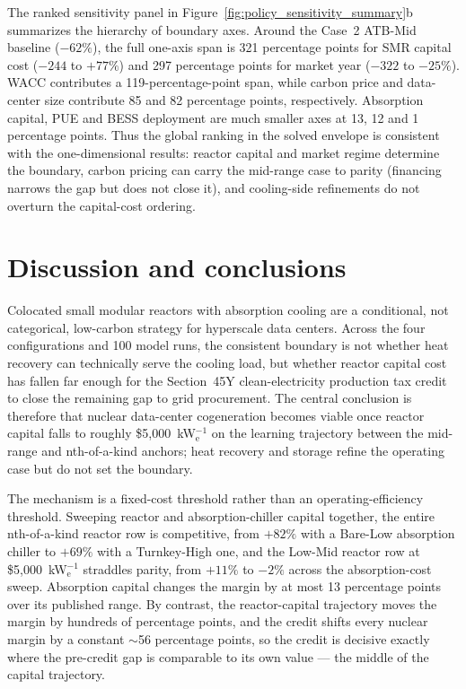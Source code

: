 \documentclass[sn-vancouver,Numbered]{sn-jnl}%
\begin{document}
The ranked sensitivity panel in Figure~\ref{fig:policy_sensitivity_summary}b summarizes the hierarchy of boundary axes. Around the Case~2 ATB-Mid baseline ($-62\%$), the full one-axis span is 321 percentage points for SMR capital cost ($-244$ to $+77\%$) and 297 percentage points for market year ($-322$ to $-25\%$). WACC contributes a 119-percentage-point span, while carbon price and data-center size contribute 85 and 82 percentage points, respectively. Absorption capital, PUE and BESS deployment are much smaller axes at 13, 12 and 1 percentage points. Thus the global ranking in the solved envelope is consistent with the one-dimensional results: reactor capital and market regime determine the boundary, carbon pricing can carry the mid-range case to parity (financing narrows the gap but does not close it), and cooling-side refinements do not overturn the capital-cost ordering.

\section{Discussion and conclusions}
\label{sec:discussion}

Colocated small modular reactors with absorption cooling are a conditional, not categorical, low-carbon strategy for hyperscale data centers. Across the four configurations and 100 model runs, the consistent boundary is not whether heat recovery can technically serve the cooling load, but whether reactor capital cost has fallen far enough for the Section~45Y clean-electricity production tax credit to close the remaining gap to grid procurement. The central conclusion is therefore that nuclear data-center cogeneration becomes viable once reactor capital falls to roughly \$5{,}000~kW$_\mathrm{e}^{-1}$ on the learning trajectory between the mid-range and nth-of-a-kind anchors; heat recovery and storage refine the operating case but do not set the boundary.

The mechanism is a fixed-cost threshold rather than an operating-efficiency threshold. Sweeping reactor and absorption-chiller capital together, the entire nth-of-a-kind reactor row is competitive, from $+82\%$ with a Bare-Low absorption chiller to $+69\%$ with a Turnkey-High one, and the Low-Mid reactor row at \$5{,}000~kW$_\mathrm{e}^{-1}$ straddles parity, from $+11\%$ to $-2\%$ across the absorption-cost sweep. Absorption capital changes the margin by at most 13 percentage points over its published range. By contrast, the reactor-capital trajectory moves the margin by hundreds of percentage points, and the credit shifts every nuclear margin by a constant $\sim$56 percentage points, so the credit is decisive exactly where the pre-credit gap is comparable to its own value — the middle of the capital trajectory.
\end{document}
